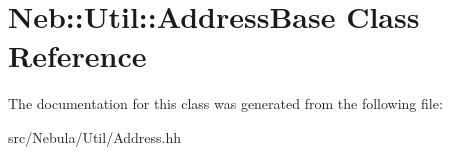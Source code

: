 \hypertarget{classNeb_1_1Util_1_1AddressBase}{\section{\-Neb\-:\-:\-Util\-:\-:\-Address\-Base \-Class \-Reference}
\label{classNeb_1_1Util_1_1AddressBase}
}


\-The documentation for this class was generated from the following file\-:\begin{DoxyCompactItemize}
\item 
src/\-Nebula/\-Util/\-Address.\-hh\end{DoxyCompactItemize}

